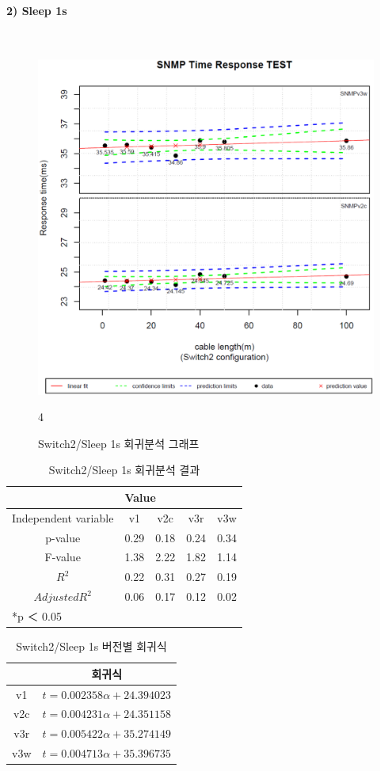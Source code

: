 \documentclass[11pt
  , a4paper
  , article
  , oneside
]{memoir}
\begin{document}
\clearpage
\paragraph{2) Sleep 1s}
   　
\begin{figure}[h!]
  \centering
  \includegraphics[width=0.5 \textwidth]{./images/s2s1.eps}
  \caption{Switch2/Sleep 1s 회귀분석 그래프}
4\end{figure}


\begin{table}[!htb]
\begin{center}
\begin{tabular}{c|c|c|c|c}\hline
& \multicolumn{4}{l}{Value} \\ \hline
Independent variable & v1 & v2c & v3r & v3w \\ \hline\hline
p-value& 0.29 & 0.18 & 0.24 & 0.34 \\ \hline
F-value& 1.38 & 2.22 & 1.82 & 1.14 \\ \hline
$  R^2  $ & 0.22 & 0.31 & 0.27 & 0.19 \\\hline
$ Adjusted R^2 $ & 0.06 & 0.17 & 0.12 & 0.02 \\\hline 
\multicolumn{5}{l}{*p ＜ 0.05} \\ \hline
\end{tabular}
\caption{Switch2/Sleep 1s 회귀분석 결과}
\end{center}
\end{table} 


\begin{table}[!htb]
\begin{center}
\begin{tabular}{c|c}\hline
 & 회귀식  \\ \hline\hline
v1 &  $ t=0.002358\alpha + 24.394023 $  \\ 
v2c & $ t=0.004231\alpha + 24.351158 $ \\ 
v3r & $ t=0.005422\alpha + 35.274149 $ \\ 
v3w & $ t=0.004713\alpha + 35.396735 $  \\ \hline
\end{tabular}
\caption{Switch2/Sleep 1s 버전별 회귀식}
\end{center}
\end{table} 
\end{document}
